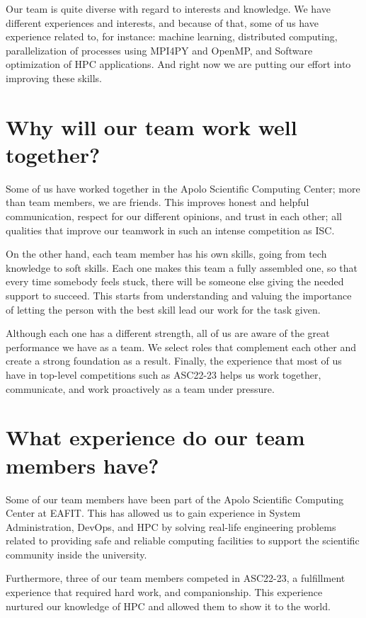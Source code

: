 \documentclass[11pt,a4paper,twocolumn]{article}
\begin{document}
Our team is quite diverse with regard to interests and knowledge. We have different experiences and interests, and because of that, some of us have experience related to, for instance: machine learning, distributed computing, parallelization of processes using MPI4PY and OpenMP, and Software optimization of HPC applications. And right now we are putting our effort into improving these skills.

\section{Why will our team work well together?}

Some of us have worked together in the Apolo Scientific Computing Center; more than team members, we are friends. This improves honest and helpful communication, respect for our different opinions, and trust in each other; all qualities that improve our teamwork in such an intense competition as ISC.

On the other hand, each team member has his own skills, going from tech knowledge to soft skills. Each one makes this team a fully assembled one, so that every time somebody feels stuck, there will be someone else giving the needed support to succeed. This starts from understanding and valuing the importance of letting the person with the best skill lead our work for the task given.

Although each one has a different strength, all of us are aware of the great performance we have as a team. We select roles that complement each other and create a strong foundation as a result. Finally, the experience that most of us have in top-level competitions such as ASC22-23 helps us work together, communicate, and work proactively as a team under pressure.

\section{What experience do our team members have?}

Some of our team members have been part of the Apolo Scientific Computing Center at EAFIT. This has allowed us to gain experience in System Administration, DevOps, and HPC by solving real-life engineering problems related to providing safe and reliable computing facilities to support the scientific community inside the university.

Furthermore, three of our team members competed in ASC22-23, a fulfillment experience that required hard work, and companionship. This experience nurtured our knowledge of HPC and allowed them to show it to the world.
\end{document}
